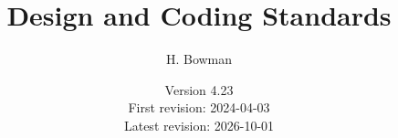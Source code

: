 \newcommand{\DocumentTitle}{Design and Coding Standards}
\newcommand{\DocumentSubTitle}{For Documents, Computer systems and the Languages; C, Python and LaTeX}
\newcommand{\DocumentAuthor}{H. Bowman}
\newcommand{\DocumentVersion}{4.23}
\newcommand{\FirstVersionDate}{2024-04-03}
\newcommand{\LatestVersionDate}{2026-10-01}

\title{\DocumentTitle{}}
\author{\DocumentAuthor{}}
\date{
    Version \DocumentVersion{}\\
    First revision: \FirstVersionDate{}\\
    Latest revision: \LatestVersionDate{}
}
